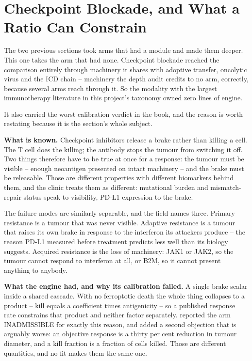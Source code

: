 \documentclass[11pt,twoside,openright]{report}
\begin{document}
\section{Checkpoint Blockade, and What a Ratio Can Constrain}

The two previous sections took arms that had a module and made them deeper. This one takes the arm that had none. Checkpoint blockade reached the comparison entirely through machinery it shares with adoptive transfer, oncolytic virus and the ICD chain -- machinery the depth audit credits to no arm, correctly, because several arms reach through it. So the modality with the largest immunotherapy literature in this project's taxonomy owned zero lines of engine.

It also carried the worst calibration verdict in the book, and the reason is worth restating because it is the section's whole subject.

\textbf{What is known.} Checkpoint inhibitors release a brake rather than killing a cell. The T cell does the killing; the antibody stops the tumour from switching it off. Two things therefore have to be true at once for a response: the tumour must be visible -- enough neoantigen presented on intact machinery -- and the brake must be releasable. Those are different properties with different biomarkers behind them, and the clinic treats them as different: mutational burden and mismatch-repair status speak to visibility, PD-L1 expression to the brake.

The failure modes are similarly separable, and the field names three. Primary resistance is a tumour that was never visible. Adaptive resistance is a tumour that raises its own brake in response to the interferon its attackers produce -- the reason PD-L1 measured before treatment predicts less well than its biology suggests. Acquired resistance is the loss of machinery: JAK1 or JAK2, so the tumour cannot respond to interferon at all, or B2M, so it cannot present anything to anybody.

\textbf{What the engine had, and why its calibration failed.} A single brake scalar inside a shared cascade. With no ferroptotic death the whole thing collapses to a product -- kill equals a coefficient times antigenicity -- so a published response rate constrains that product and neither factor separately.  reported the arm INADMISSIBLE for exactly this reason, and added a second objection that is arguably worse: an objective response is a thirty per cent reduction in tumour diameter, and a kill fraction is a fraction of cells killed. Those are different quantities, and no fit makes them the same one.
\end{document}
